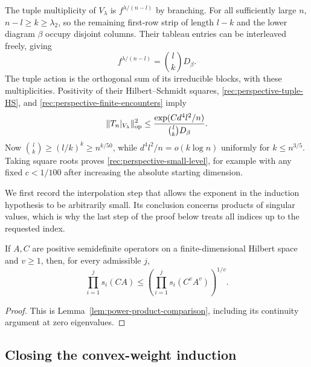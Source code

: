The tuple multiplicity of $V_\lambda$ is
$f^{\lambda/(n-l)}$ by branching.  For all sufficiently large $n$,
$n-l\ge k\ge\lambda_2$, so the remaining first-row strip of length
$l-k$ and the lower diagram $\beta$ occupy disjoint columns.
Their tableau entries can be interleaved freely, giving
\begin{equation}\label{rec:perspective-tuple-multiplicity}
 f^{\lambda/(n-l)}=\binom lk D_\beta.
\end{equation}
The tuple action is the orthogonal sum of its irreducible blocks,
with these multiplicities.  Positivity of their Hilbert--Schmidt
squares, \eqref{rec:perspective-tuple-HS}, and
\eqref{rec:perspective-finite-encounters} imply
\[
 \|T_n|_{V_\lambda}\|_{\mathrm{op}}^2
 \le\frac{\exp(Cd^4l^2/n)}{\binom lk D_\beta}.
\]
Now $\binom lk\ge(l/k)^k\ge n^{k/50}$, while
$d^4l^2/n=o(k\log n)$ uniformly for $k\le n^{3/5}$.
Taking square roots proves \eqref{rec:perspective-small-level},
for example with any fixed $c<1/100$ after increasing the absolute
starting dimension.

We first record the interpolation step that allows the exponent in the
induction hypothesis to be arbitrarily small.  Its conclusion concerns
products of singular values, which is why the last step of the proof
below treats all indices up to the requested index.

\begin{lemma}\label{grid:perspective-power-interpolation}
If $A,C$ are positive semidefinite operators on a finite-dimensional
Hilbert space and $v\ge1$, then, for every admissible $j$,
\begin{equation}\label{grid:perspective-power-products}
 \prod_{i=1}^j s_i(CA)
 \le \left(\prod_{i=1}^j s_i(C^vA^v)\right)^{1/v}.
\end{equation}
\end{lemma}
\begin{proof}
This is Lemma~\ref{lem:power-product-comparison}, including its
continuity argument at zero eigenvalues.
\end{proof}

\subsection{Closing the convex-weight induction}

